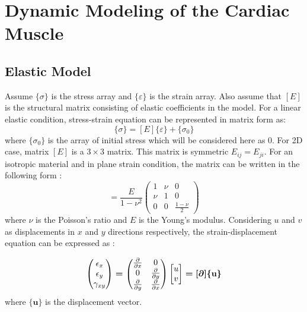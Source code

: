 \documentclass{jicspack}
\begin{document}
\section{Dynamic Modeling of the Cardiac Muscle}
\subsection{Elastic Model}
Assume $\{\sigma\}$ is the stress array and $\{\varepsilon\}$ is the strain array. Also assume that $[E]$ is the
structural matrix consisting of elastic coefficients in the model. For a linear elastic condition,
stress-strain equation can be represented in matrix form as:
\begin{equation}
\{\sigma\}=[E]\{\varepsilon\}+\{\sigma_0\}
\end{equation}
where $\{\sigma_0\}$ is the array of initial stress which will be considered here as 0. For 2D case, matrix $[E]$ is a $3\times 3$ matrix. This matrix is symmetric $E_{ij}=E_{ji}$. For an isotropic material and in plane strain condition, the matrix can be written in the following form \cite{21}:
\begin{equation}
[E]=\frac{E}{1-\nu^2} \begin{pmatrix}
  1 & \nu & 0 \\
  \nu & 1 & 0 \\
  0 & 0 & \frac{1-\nu}{2}
 \end{pmatrix}
\end{equation}
where $\nu$ is the Poisson's ratio and $E$ is the Young's modulus. Considering $u$ and $v$ as displacements in $x$ and $y$ directions respectively, the strain-displacement
equation can be expressed as \cite{22}: 

\begin{equation}
\begin{pmatrix} \epsilon_x \\ \epsilon_y \\ \gamma_{xy} \end{pmatrix}
=\begin{pmatrix}     

\frac{\partial}{\partial x} & 0 \\
0 & \frac{\partial}{\partial y} \\
\frac{\partial}{\partial y} & \frac{\partial}{\partial x}
\end{pmatrix}
\begin{bmatrix}
u \\ v
\end{bmatrix} 
= [\boldmath{\partial}]\{\textbf{u}\}
\end{equation}
where $\{\textbf{u}\}$ is the displacement vector. 
\end{document}
